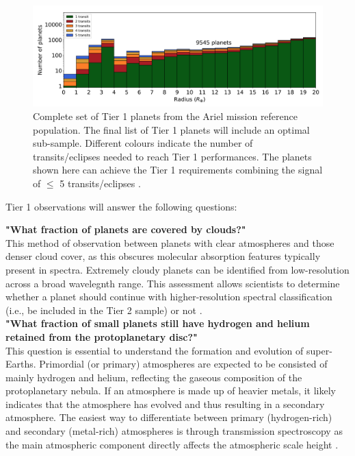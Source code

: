 \documentclass[12pt]{article}
\begin{document}
\begin{figure}[H]
    \centering
    \includegraphics[width=.9\textwidth]{tier 1 transit graph.png}
    \caption{Complete set of Tier 1 planets from the Ariel mission reference population. The final list of Tier 1 planets will include an optimal sub-sample. Different colours indicate the number of transits/eclipses needed to reach
    Tier 1 performances. The planets shown here can achieve the Tier 1 requirements combining the signal of $\leq$ 5 transits/eclipses \protect\cite{zingales2018ariel}.}
    \label{fig:3}
\end{figure}

Tier 1 observations will answer the following questions:

\textbf{"What fraction of planets are covered by clouds?"}\\
This method of observation between planets with clear atmospheres and those denser cloud cover, as this obscures molecular absorption features typically present in spectra.
Extremely cloudy planets can be identified from low-resolution across a broad wavelegnth range. This assessment allows scientists to determine whether a planet should continue with higher-resolution spectral classification
(i.e., be included in the Tier 2 sample) or not \cite{salvignol2024ariel}.\\

\textbf{"What fraction of small planets still have hydrogen and helium retained from the protoplanetary disc?"}\\
This question is essential to understand the formation and evolution of super-Earths. Primordial (or primary) atmospheres are expected to be consisted of mainly hydrogen and helium,
reflecting the gaseous composition of the protoplanetary nebula. If an atmosphere is made up of heavier metals, it likely indicates that the atmosphere has evolved and thus resulting in a secondary atmosphere.
The easiest way to differentiate between primary (hydrogen-rich) and secondary (metal-rich) atmospheres is through transmission spectroscopy as the main atmospheric component directly affects the atmospheric scale height \cite{salvignol2024ariel}. \\
\end{document}
